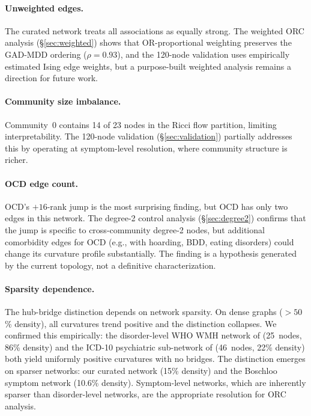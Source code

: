 \documentclass{article}
\begin{document}
\paragraph{Unweighted edges.} The curated network treats all associations as equally strong. The weighted ORC analysis (\S\ref{sec:weighted}) shows that OR-proportional weighting preserves the GAD-MDD ordering ($\rho = 0.93$), and the 120-node validation uses empirically estimated Ising edge weights, but a purpose-built weighted analysis remains a direction for future work.

\paragraph{Community size imbalance.} Community~0 contains 14 of 23 nodes in the Ricci flow partition, limiting interpretability. The 120-node validation (\S\ref{sec:validation}) partially addresses this by operating at symptom-level resolution, where community structure is richer.

\paragraph{OCD edge count.} OCD's $+16$-rank jump is the most surprising finding, but OCD has only two edges in this network. The degree-2 control analysis (\S\ref{sec:degree2}) confirms that the jump is specific to cross-community degree-2 nodes, but additional comorbidity edges for OCD (e.g., with hoarding, BDD, eating disorders) could change its curvature profile substantially. The finding is a hypothesis generated by the current topology, not a definitive characterization.

\paragraph{Sparsity dependence.} The hub-bridge distinction depends on network sparsity. On dense graphs ($>50$\% density), all curvatures trend positive and the distinction collapses. We confirmed this empirically: the disorder-level WHO WMH network of \citet{mcgrath2020comorbidity} (25~nodes, 86\% density) and the ICD-10 psychiatric sub-network of \citet{dervic2025comorbidity} (46~nodes, 22\% density) both yield uniformly positive curvatures with no bridges. The distinction emerges on sparser networks: our curated network (15\% density) and the Boschloo symptom network (10.6\% density). Symptom-level networks, which are inherently sparser than disorder-level networks, are the appropriate resolution for ORC analysis.
\end{document}
